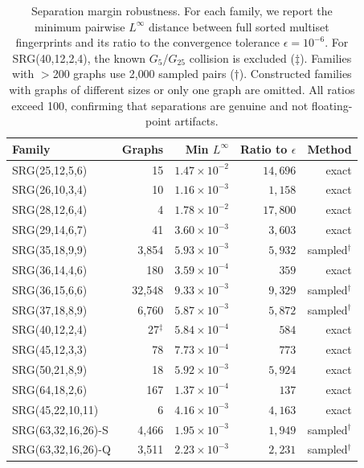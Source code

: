 \documentclass[11pt,a4paper]{article}
\begin{document}
\begin{table}[t]
\centering
\caption{Separation margin robustness.
For each family, we report the minimum pairwise $L^{\infty}$ distance between full sorted multiset fingerprints and its ratio to the convergence tolerance $\epsilon = 10^{-6}$.
For SRG(40,12,2,4), the known $G_5$/$G_{25}$ collision is excluded ($\ddagger$).
Families with $>$200 graphs use 2{,}000 sampled pairs ($\dagger$).
Constructed families with graphs of different sizes or only one graph are omitted.
All ratios exceed 100, confirming that separations are genuine and not floating-point artifacts.}
\label{tab:robustness}
\begin{tabular}{@{}lrrrr@{}}
\toprule
Family & Graphs & Min $L^{\infty}$ & Ratio to $\epsilon$ & Method \\
\midrule
SRG(25,12,5,6)   &        15 & $1.47 \times 10^{-2}$ & $14{,}696$ & exact \\
SRG(26,10,3,4)   &        10 & $1.16 \times 10^{-3}$ &  $1{,}158$ & exact \\
SRG(28,12,6,4)   &         4 & $1.78 \times 10^{-2}$ & $17{,}800$ & exact \\
SRG(29,14,6,7)   &        41 & $3.60 \times 10^{-3}$ &  $3{,}603$ & exact \\
SRG(35,18,9,9)   &   3{,}854 & $5.93 \times 10^{-3}$ &  $5{,}932$ & sampled$^\dagger$ \\
SRG(36,14,4,6)   &       180 & $3.59 \times 10^{-4}$ &      $359$ & exact \\
SRG(36,15,6,6)   &  32{,}548 & $9.33 \times 10^{-3}$ &  $9{,}329$ & sampled$^\dagger$ \\
SRG(37,18,8,9)   &   6{,}760 & $5.87 \times 10^{-3}$ &  $5{,}872$ & sampled$^\dagger$ \\
SRG(40,12,2,4)   &   27$^\ddagger$ & $5.84 \times 10^{-4}$ &      $584$ & exact \\
SRG(45,12,3,3)   &        78 & $7.73 \times 10^{-4}$ &      $773$ & exact \\
SRG(50,21,8,9)   &        18 & $5.92 \times 10^{-3}$ &  $5{,}924$ & exact \\
SRG(64,18,2,6)   &       167 & $1.37 \times 10^{-4}$ &      $137$ & exact \\
\midrule
SRG(45,22,10,11)              &         6 & $4.16 \times 10^{-3}$ &  $4{,}163$ & exact \\
SRG(63,32,16,26)-S            &   4{,}466 & $1.95 \times 10^{-3}$ &  $1{,}949$ & sampled$^\dagger$ \\
SRG(63,32,16,26)-Q            &   3{,}511 & $2.23 \times 10^{-3}$ &  $2{,}231$ & sampled$^\dagger$ \\

\end{tabular}
\end{table}
\end{document}
